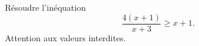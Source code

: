 
\begin{exercice}\label{exosmath-0353}

Résoudre l'inéquation
\begin{equation}
    \frac{ 4(x+1) }{ x+3 }\geq x+1.
\end{equation}
Attention aux valeurs interdites.

\end{exercice}
